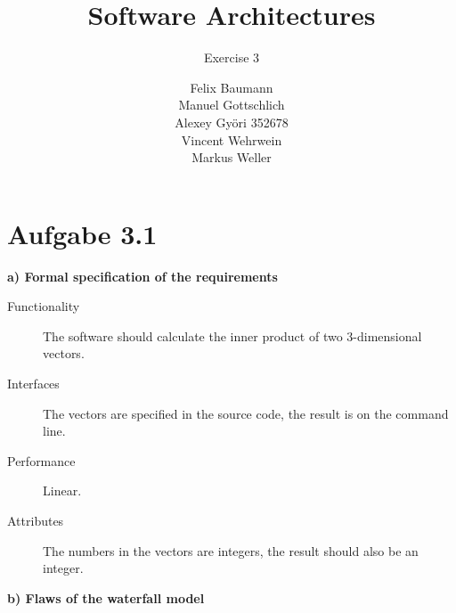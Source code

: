 \documentclass[a4paper,10pt]{scrartcl}[2003/01/01]
\title{Software Architectures}
\subtitle{Exercise 3}
\author{ Felix Baumann \\ Manuel Gottschlich \\  Alexey Gy\"ori 352678 \\ Vincent Wehrwein \\ Markus Weller}
\begin{document}
    \maketitle
    
    \section*{Aufgabe 3.1}
    \textbf{a) Formal specification of the requirements}
    \begin{description}
      \item[Functionality] The software should calculate the inner product of two 3-dimensional vectors.
      \item[Interfaces] The vectors are specified in the source code, the result is on the command line.
      \item[Performance] Linear.
      \item[Attributes] The numbers in the vectors are integers, the result should also be an integer. 
    \end{description}
    
    \textbf{b) Flaws of the waterfall model}
    
\end{document}
